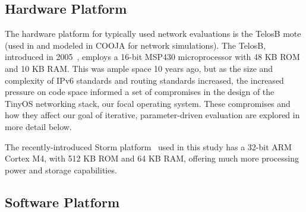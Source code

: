\subsection{Hardware Platform}

The hardware platform for typically used network evaluations is the TelosB mote (used in \cite{ko2011evaluating} and modeled in COOJA for network simulations).
The TelosB, introduced in 2005~\cite{polastre2005telos},  employs a 16-bit MSP430 microprocessor with 48 KB ROM and 10 KB RAM.
This was ample space 10 years ago, but as the size and complexity of IPv6 standards and routing standards increased, the increased pressure on code space informed a set of compromises in the design of the TinyOS networking stack, our focal operating system.
These compromises and how they affect our goal of iterative, parameter-driven evaluation are explored in more detail below.

The recently-introduced Storm platform~\cite{andersen2016system} used in this study has a 32-bit ARM Cortex M4, with 512 KB ROM and 64 KB RAM, offering much more processing power and storage capabilities.


\subsection{Software Platform}

